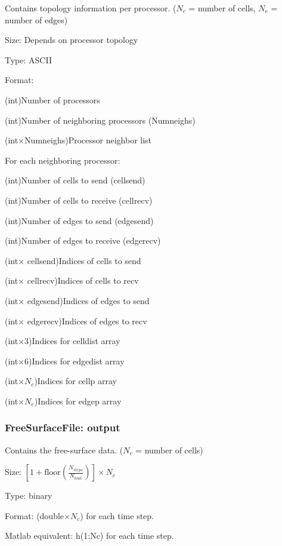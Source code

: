 Contains topology information per processor. ($N_c$ = number of cells, $N_e$ = number of edges)
\begin{list}{}
\item Size: Depends on processor topology
\item Type: ASCII
\item Format:
\begin{list}{}
\item (int)Number of processors
\item (int)Number of neighboring processors (Numneighs)
\item (int$\times$Numneighs)Processor neighbor list
\item For each neighboring processor:
\begin{list}{}
\item (int)Number of cells to send (cellsend)
\item (int)Number of cells to receive (cellrecv)
\item (int)Number of edges to send (edgesend)
\item (int)Number of edges to receive (edgerecv)
\item (int$\times$ cellsend)Indices of cells to send
\item (int$\times$ cellrecv)Indices of cells to recv
\item (int$\times$ edgesend)Indices of edges to send
\item (int$\times$ edgerecv)Indices of edges to recv
\end{list}
\item (int$\times$3)Indices for celldist array
\item (int$\times$6)Indices for edgedist array
\item (int$\times N_c$)Indices for cellp array
\item (int$\times N_e$)Indices for edgep array
\end{list}
\end{list}

\subsubsection{FreeSurfaceFile: output}

Contains the free-surface data. ($N_c$ = number of cells)
\begin{list}{}
\item Size: $\left[1+\mbox{floor}\left(\frac{N_{steps}}{N_{tout}}\right)\right]\times N_c$
\item Type: binary
\item Format: (double$\times N_c$) for each time step.  
\item Matlab equivalent: h(1:Nc) for each time step.
\end{list}

